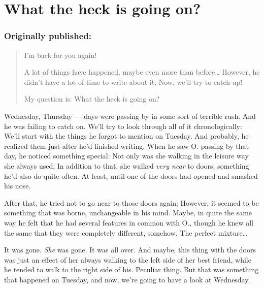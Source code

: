 \chapter{What the heck is going on?}
\label{cha:what-heck-going}
\subsection*{Originally published: }
\begin{quote}
I'm back for you again!

A lot of things have happened, maybe even more than before\dots{}
However, he didn't have a lot of time to write about it; Now, we'll try to catch up!

My question is: What the heck is going on?
\end{quote}

Wednesday, Thursday --- days were passing by in some sort of terrible rush. 
And he was failing to catch on. 
We'll try to look through all of it chronologically: We'll start with the things he forgot to mention on Tuesday. 
And probably, he realized them just after he'd finished writing. 
When he saw O. passing by that day, he noticed something special: Not only was she walking in the leisure way she always used; In addition to that, she walked \emph{very near} to doors, something he'd also do quite often. 
At least, until one of the doors had opened and smashed his nose.

After that, he tried not to go near to those doors again; However, it seemed to be something that was borne, unchangeable in his mind. 
Maybe, in quite the same way he felt that he had several features in common with O., though he knew all the same that they were completely different, somehow. 
The perfect mixture\dots{}

It was gone. \emph{She} was gone. It was all over. 
And maybe, this thing with the doors was just an effect of her always walking to the left side of her best friend, while he tended to walk to the right side of his. 
Peculiar thing.
But that was something that happened on Tuesday, and now, we're going to have a look at Wednesday. 

